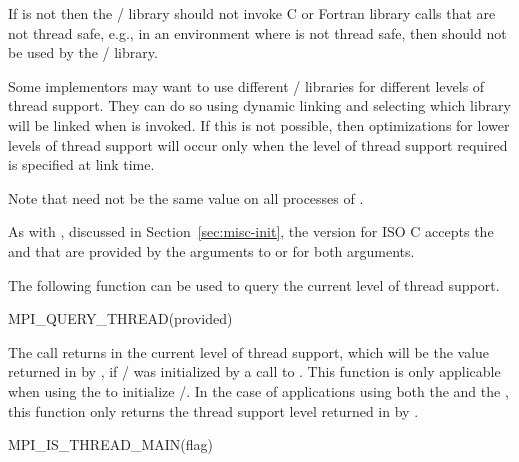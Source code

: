 \begin{implementors}
If  is not  then the \MPI/
library should not
invoke C or Fortran library calls that are
not thread safe, e.g., in an environment where  is not thread
safe, then  should not be used by the \MPI/ library.

Some implementors may want to use different \MPI/ libraries for
different levels of thread support.   They can do so using dynamic
linking and selecting which library will be linked when
 is invoked.
If this is not possible, then optimizations for lower levels
of thread support will occur only when the level of thread support required
is specified at link time.

Note that  need not be the same value on all
processes of .
\end{implementors}

As with , discussed in Section~\ref{sec:misc-init}, the version for ISO C accepts
the  and  that are provided by the arguments to  or 
for both arguments.

The following function can be used to query the current level of thread
support.

\begin{funcdef}{MPI\_QUERY\_THREAD}{(\mbox{provided})}
\end{funcdef}

The call returns in  the current level of thread
support, which will be the value returned in  by
, if \MPI/
was initialized by a call to .
This function is only applicable when using the \wpm{} to
initialize \MPI/.  In the case of applications using both the \wpm{}
and the \spm{}, this function only returns the
thread support level returned in  by .

%
\begin{funcdef}{MPI\_IS\_THREAD\_MAIN}{(\mbox{flag})}
\end{funcdef}


